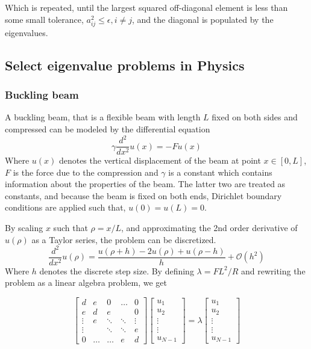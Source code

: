 \documentclass[10pt,showpacs,preprintnumbers,footinbib,amsmath,amssymb,aps,prl,twocolumn,groupedaddress,superscriptaddress,showkeys]{revtex4-1}
\begin{document}
Which is repeated, until the largest squared off-diagonal element is less than some small tolerance, $a_{ij}^2 \leq \epsilon, i\neq j$, and the diagonal is populated by the eigenvalues.

\subsection{Select eigenvalue problems in Physics}
  \subsubsection{Buckling beam}
    A buckling beam, that is a flexible beam with length $L$ fixed on both sides and compressed can be modeled by the differential equation 
    \begin{equation}
      \gamma \frac{d^2}{dx^2}u(x) = -Fu(x)
    \end{equation}
    Where $u(x)$ denotes the vertical displacement of the beam at point $x \in [0, L]$, $F$ is the force due to the compression and $\gamma$ is a constant which contains information about the properties of the beam. The latter two are treated as constants, and because the beam is fixed on both ends, Dirichlet boundary conditions are applied such that, $u(0) = u(L) = 0$.

    By scaling $x$ such that $\rho = x / L$, and approximating the 2nd order derivative of $u(\rho)$ as a Taylor series, the problem can be discretized.
    \begin{equation}
      \frac{d^2}{dx^2} u(\rho) = \frac{u(\rho + h) - 2u(\rho) + u(\rho - h)}{h} + \mathcal O(h^2)
    \end{equation}
    Where $h$ denotes the discrete step size. By defining $\lambda = FL^2 / R$ and rewriting the problem as a linear algebra problem, we get

    \begin{equation}
      \label{eqn:eigenval matrix}
      \begin{bmatrix}
        d & e & 0 & \dots & 0 \\
        e & d & e &  & 0 \\
        \vdots & e & \ddots & \ddots & \vdots \\
        \vdots &  & \ddots & \ddots & e \\
        0 & \dots & \dots &  e & d
      \end{bmatrix}
      \begin{bmatrix}
        u_1 \\ u_2 \\ \vdots \\ \vdots \\ u_{N-1}
      \end{bmatrix}
      =
      \lambda
      \begin{bmatrix}
        u_1 \\ u_2 \\ \vdots \\ \vdots \\ u_{N-1}
      \end{bmatrix}
    \end{equation}
\end{document}
